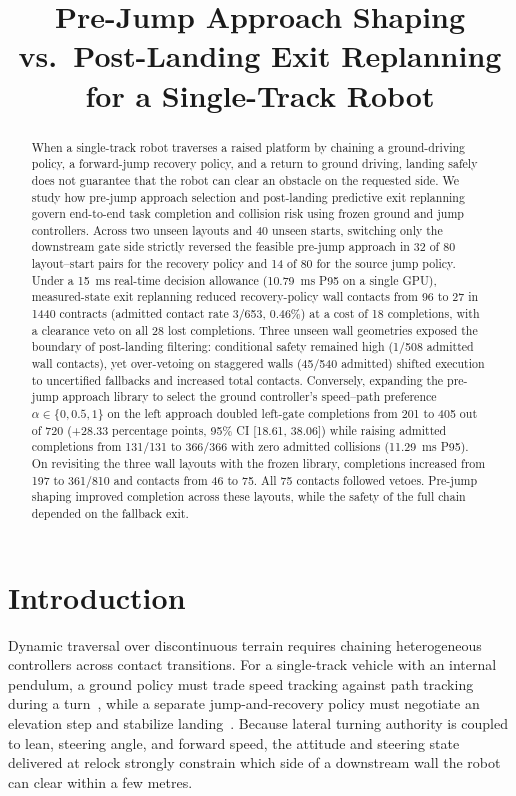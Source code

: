 \documentclass[letterpaper,10pt,conference]{ieeeconf}
\title{\LARGE \bf Pre-Jump Approach Shaping vs.\ Post-Landing Exit Replanning\\for a Single-Track Robot}
\author{}
\begin{document}
\raggedbottom
\maketitle

\begin{abstract}
When a single-track robot traverses a raised platform by chaining a ground-driving policy, a forward-jump recovery policy, and a return to ground driving, landing safely does not guarantee that the robot can clear an obstacle on the requested side. We study how pre-jump approach selection and post-landing predictive exit replanning govern end-to-end task completion and collision risk using frozen ground and jump controllers. Across two unseen layouts and 40 unseen starts, switching only the downstream gate side strictly reversed the feasible pre-jump approach in 32 of 80 layout--start pairs for the recovery policy and 14 of 80 for the source jump policy. Under a 15~ms real-time decision allowance (10.79~ms P95 on a single GPU), measured-state exit replanning reduced recovery-policy wall contacts from 96 to 27 in 1440 contracts (admitted contact rate 3/653, 0.46\%) at a cost of 18 completions, with a clearance veto on all 28 lost completions. Three unseen wall geometries exposed the boundary of post-landing filtering: conditional safety remained high (1/508 admitted wall contacts), yet over-vetoing on staggered walls (45/540 admitted) shifted execution to uncertified fallbacks and increased total contacts. Conversely, expanding the pre-jump approach library to select the ground controller's speed--path preference $\alpha\in\{0,0.5,1\}$ on the left approach doubled left-gate completions from 201 to 405 out of 720 (+28.33 percentage points, 95\% CI [18.61, 38.06]) while raising admitted completions from 131/131 to 366/366 with zero admitted collisions (11.29~ms P95). On revisiting the three wall layouts with the frozen library, completions increased from 197 to 361/810 and contacts from 46 to 75. All 75 contacts followed vetoes. Pre-jump shaping improved completion across these layouts, while the safety of the full chain depended on the fallback exit.
\end{abstract}

\section{Introduction}
Dynamic traversal over discontinuous terrain requires chaining heterogeneous controllers across contact transitions. For a single-track vehicle with an internal pendulum, a ground policy must trade speed tracking against path tracking during a turn~\cite{sttw}, while a separate jump-and-recovery policy must negotiate an elevation step and stabilize landing~\cite{rb}. Because lateral turning authority is coupled to lean, steering angle, and forward speed, the attitude and steering state delivered at relock strongly constrain which side of a downstream wall the robot can clear within a few metres.
\end{document}
